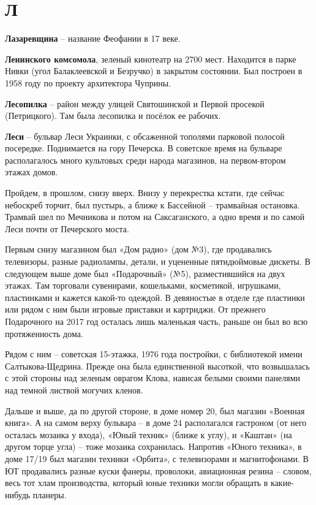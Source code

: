 \chapter*{Л}

\textbf{Лазаревщина} – название Феофании в 17 веке.\\

\medskip

\textbf{Ленинского комсомола}, зеленый кинотеатр на 2700 мест. Находится в парке Нивки (угол Балаклеевской и Безручко) в закрытом состоянии. Был построен в 1958 году по проекту архитектора Чуприны.\\

\medskip

\textbf{Лесопилка} – район между улицей Святошинской и Первой просекой (Петрицкого). Там была лесопилка и посёлок ее рабочих.\\

\medskip

\textbf{Леси} – бульвар Леси Украинки, с обсаженной тополями парковой полосой посередке. По\-днимается на гору Печерска. В советское время на бульваре располагалось много культовых среди народа магазинов, на первом-втором этажах домов.

Пройдем, в прошлом, снизу вверх. Внизу у перекрестка кстати, где сейчас небоскреб торчит, был пустырь, а ближе к Бассейной – трамвайная остановка. Трамвай шел по Мечникова и потом на Саксаганского, а одно время и по самой Леси почти от Печерского моста. 

Первым снизу магазином был «Дом радио» (дом №3), где продавались телевизоры, разные радиолампы, детали, и уцененные пятидюймовые дискеты. В следующем выше доме был «Подарочный» (№5), разместившийся на двух этажах. Там торговали сувенирами, кошельками, косметикой, игрушками, пластинками и кажется какой-то одеждой. В девяностые в отделе где пластинки или рядом с ним были игровые приставки и картриджи. От прежнего Подарочного на 2017 год осталась лишь маленькая часть, раньше он был во всю протяженность дома. 

Рядом с ним – советская 15-этажка, 1976 года постройки, с библиотекой имени Салтыкова-Щедрина. Прежде она была единственной высоткой, что возвышалась с этой стороны над зеленым оврагом Клова, нависая белыми своими панелями над темной листвой могучих кленов.

Дальше и выше, да по другой стороне, в доме номер 20, был магазин «Военная книга». А на самом верху бульвара – в доме 24 располагался гастроном (от него осталась мозаика у входа), «Юный техник» (ближе к углу), и «Каштан» (на другом торце угла) – тоже мозаика сохранилась. Напротив «Юного техника», в доме 17/19 был магазин техники «Орбита», с телевизорами и магнитофонами. В ЮТ продавались разные куски фанеры, проволоки, авиационная резина – словом, весь тот хлам производства, который юные техники могли обращать в какие-нибудь планеры.\\

